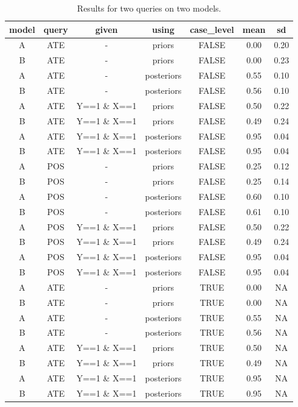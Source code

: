 \documentclass[
  11pt,
  article]{jss}
\begin{document}
\begin{longtable}[t]{ccccccc}

\caption{\label{tbl-batch-query}Results for two queries on two models.}

\tabularnewline

\toprule
model & query & given & using & case\_level & mean & sd\\
\midrule
A & ATE & - & priors & FALSE & 0.00 & 0.20\\
B & ATE & - & priors & FALSE & 0.00 & 0.23\\
A & ATE & - & posteriors & FALSE & 0.55 & 0.10\\
B & ATE & - & posteriors & FALSE & 0.56 & 0.10\\
A & ATE & Y==1 \& X==1 & priors & FALSE & 0.50 & 0.22\\
\addlinespace
B & ATE & Y==1 \& X==1 & priors & FALSE & 0.49 & 0.24\\
A & ATE & Y==1 \& X==1 & posteriors & FALSE & 0.95 & 0.04\\
B & ATE & Y==1 \& X==1 & posteriors & FALSE & 0.95 & 0.04\\
A & POS & - & priors & FALSE & 0.25 & 0.12\\
B & POS & - & priors & FALSE & 0.25 & 0.14\\
\addlinespace
A & POS & - & posteriors & FALSE & 0.60 & 0.10\\
B & POS & - & posteriors & FALSE & 0.61 & 0.10\\
A & POS & Y==1 \& X==1 & priors & FALSE & 0.50 & 0.22\\
B & POS & Y==1 \& X==1 & priors & FALSE & 0.49 & 0.24\\
A & POS & Y==1 \& X==1 & posteriors & FALSE & 0.95 & 0.04\\
\addlinespace
B & POS & Y==1 \& X==1 & posteriors & FALSE & 0.95 & 0.04\\
A & ATE & - & priors & TRUE & 0.00 & NA\\
B & ATE & - & priors & TRUE & 0.00 & NA\\
A & ATE & - & posteriors & TRUE & 0.55 & NA\\
B & ATE & - & posteriors & TRUE & 0.56 & NA\\
\addlinespace
A & ATE & Y==1 \& X==1 & priors & TRUE & 0.50 & NA\\
B & ATE & Y==1 \& X==1 & priors & TRUE & 0.49 & NA\\
A & ATE & Y==1 \& X==1 & posteriors & TRUE & 0.95 & NA\\
B & ATE & Y==1 \& X==1 & posteriors & TRUE & 0.95 & NA\\

\end{longtable}
\end{document}
